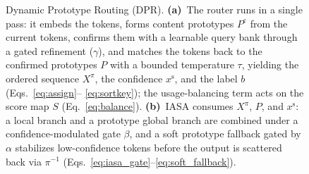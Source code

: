 \begin{figure}[H]
{\begin{tikzpicture}
\end{tikzpicture}%
}
\caption{Dynamic Prototype Routing (DPR). \textbf{(a)}~The router runs in a single
pass: it embeds the tokens, forms content prototypes $P^{\mathrm{c}}$ from the
current tokens, confirms them with a learnable query bank through a gated
refinement ($\gamma$), and matches the tokens back to the confirmed prototypes $P$
with a bounded temperature $\tau$, yielding the ordered sequence $X^{\pi}$, the
confidence $x^{\mathrm{s}}$, and the label $b$ (Eqs.~\eqref{eq:assign}--%
\eqref{eq:sortkey}); the usage-balancing term acts on the score map $S$
(Eq.~\eqref{eq:balance}). \textbf{(b)}~IASA consumes $X^{\pi}$, $P$, and
$x^{\mathrm{s}}$: a local branch and a prototype global branch are combined under a
confidence-modulated gate $\beta$, and a soft prototype fallback gated by $\alpha$
stabilizes low-confidence tokens before the output is scattered back via $\pi^{-1}$
(Eqs.~\eqref{eq:iasa_gate}--\eqref{eq:soft_fallback}).}
\label{fig:dpr}
\end{figure}
